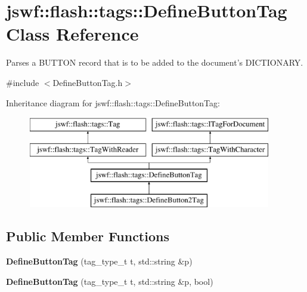 \hypertarget{classjswf_1_1flash_1_1tags_1_1_define_button_tag}{\section{jswf\+:\+:flash\+:\+:tags\+:\+:Define\+Button\+Tag Class Reference}
\label{classjswf_1_1flash_1_1tags_1_1_define_button_tag}
}


Parses a {\ttfamily B\+U\+T\+T\+O\+N} record that is to be added to the document's {\ttfamily D\+I\+C\+T\+I\+O\+N\+A\+R\+Y}.  




{\ttfamily \#include $<$Define\+Button\+Tag.\+h$>$}

Inheritance diagram for jswf\+:\+:flash\+:\+:tags\+:\+:Define\+Button\+Tag\+:\begin{figure}[H]
\begin{center}
\leavevmode
\includegraphics[height=4.000000cm]{classjswf_1_1flash_1_1tags_1_1_define_button_tag}
\end{center}
\end{figure}
\subsection*{Public Member Functions}
\begin{DoxyCompactItemize}
\item 
\hypertarget{classjswf_1_1flash_1_1tags_1_1_define_button_tag_aeb0d83077ba8f9d6267b64732f7f8dc8}{{\bfseries Define\+Button\+Tag} (tag\+\_\+type\+\_\+t t, std\+::string \&p)}\label{classjswf_1_1flash_1_1tags_1_1_define_button_tag_aeb0d83077ba8f9d6267b64732f7f8dc8}

\item 
\hypertarget{classjswf_1_1flash_1_1tags_1_1_define_button_tag_a2595f43f91fab3e3f328cbb6778cf4e0}{{\bfseries Define\+Button\+Tag} (tag\+\_\+type\+\_\+t t, std\+::string \&p, bool)}\label{classjswf_1_1flash_1_1tags_1_1_define_button_tag_a2595f43f91fab3e3f328cbb6778cf4e0}

\end{DoxyCompactItemize}
